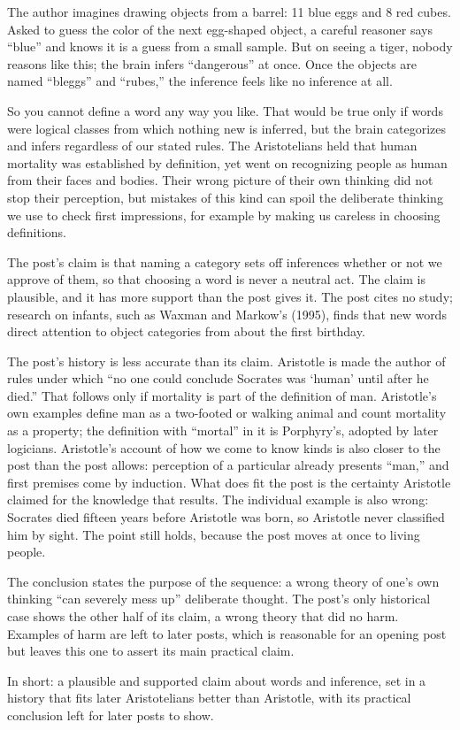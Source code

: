 \begin{afterword}
\summaryhead

The author imagines drawing objects from a barrel: 11 blue eggs and 8 red cubes. Asked to guess the color of the next egg-shaped object, a careful reasoner says ``blue'' and knows it is a guess from a small sample. But on seeing a tiger, nobody reasons like this; the brain infers ``dangerous'' at once. Once the objects are named ``bleggs'' and ``rubes,'' the inference feels like no inference at all.

So you cannot define a word any way you like. That would be true only if words were logical classes from which nothing new is inferred, but the brain categorizes and infers regardless of our stated rules. The Aristotelians held that human mortality was established by definition, yet went on recognizing people as human from their faces and bodies. Their wrong picture of their own thinking did not stop their perception, but mistakes of this kind can spoil the deliberate thinking we use to check first impressions, for example by making us careless in choosing definitions.

\responsehead

The post's claim is that naming a category sets off inferences whether or not we approve of them, so that choosing a word is never a neutral act. The claim is plausible, and it has more support than the post gives it. The post cites no study; research on infants, such as Waxman and Markow's (1995), finds that new words direct attention to object categories from about the first birthday.

The post's history is less accurate than its claim. Aristotle is made the author of rules under which ``no one could conclude Socrates was `human' until after he died.'' That follows only if mortality is part of the definition of man. Aristotle's own examples define man as a two-footed or walking animal and count mortality as a property; the definition with ``mortal'' in it is Porphyry's, adopted by later logicians. Aristotle's account of how we come to know kinds is also closer to the post than the post allows: perception of a particular already presents ``man,'' and first premises come by induction. What does fit the post is the certainty Aristotle claimed for the knowledge that results. The individual example is also wrong: Socrates died fifteen years before Aristotle was born, so Aristotle never classified him by sight. The point still holds, because the post moves at once to living people.

The conclusion states the purpose of the sequence: a wrong theory of one's own thinking ``can severely mess up'' deliberate thought. The post's only historical case shows the other half of its claim, a wrong theory that did no harm. Examples of harm are left to later posts, which is reasonable for an opening post but leaves this one to assert its main practical claim.

In short: a plausible and supported claim about words and inference, set in a history that fits later Aristotelians better than Aristotle, with its practical conclusion left for later posts to show.
\end{afterword}
